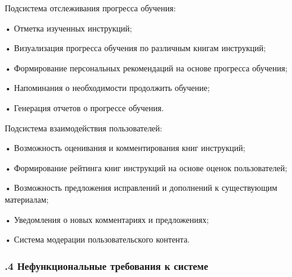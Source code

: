 {  \par \redline Подсистема отслеживания прогресса обучения:

  \par \redline • Отметка изученных инструкций;
  \par \redline • Визуализация прогресса обучения по различным книгам инструкций;
  \par \redline • Формирование персональных рекомендаций на основе прогресса обучения;
  \par \redline • Напоминания о необходимости продолжить обучение;
  \par \redline • Генерация отчетов о прогрессе обучения.

  \par \redline Подсистема взаимодействия пользователей:

  \par \redline • Возможность оценивания и комментирования книг инструкций;
  \par \redline • Формирование рейтинга книг инструкций на основе оценок пользователей;
  \par \redline • Возможность предложения исправлений и дополнений к существующим материалам;
  \par \redline • Уведомления о новых комментариях и предложениях;
  \par \redline • Система модерации пользовательского контента.

  \par
}

\subtitlespace

\subsubsection*{ 
  \gostTitleFont
  .4 Нефункциональные требования к системе
} 

\subtitlespace

